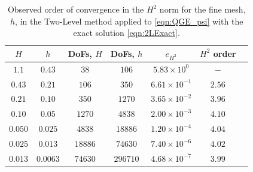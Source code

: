 \begin{table}
  \begin{center}
    \begin{tabular}{|c|c|c|c|c|c|c|}
    \hline
      $H$ &   $h$  &  DoFs, $ H $ & DoFs, $ h $ & $e_{H^2}$ & $H^2$ order \\
      \hline
      $1.1$ & $0.43$ & $38$ & $106$ & $5.83\times 10^0$ & $-$ \\
      $0.43$ & $0.21$ & $106$ & $350$ & $6.61\times 10^{-1}$ & $2.56$ \\
      $0.21$ & $0.10$ & $350$ & $1270$ & $3.65\times 10^{-2}$ & $3.96$ \\
      $0.10$ & $0.05$ & $1270$ & $4838$ & $2.00 \times 10^{-3}$ & $4.10$ \\
      $0.050$ & $0.025$ & $4838$ & $18886$ & $1.20\times 10^{-4}$ & $4.04$ \\
      $0.025$ & $0.013$ & $18886$ & $74630$ & $7.40\times 10^{-6}$ & $4.02$ \\
      $0.013$ & $0.0063$ & $74630$ & $296710$ & $4.68\times 10^{-7}$ & $3.99$ \\
    \hline
    \end{tabular}
  \end{center}
  \caption{Observed order of convergence in the $H^2$ norm for the fine mesh,
    $h$, in the Two-Level method applied to \eqref{eqn:QGE_psi} with the exact
    solution \eqref{eqn:2LExact}.}
  \label{tab:TwoLevelh}
\end{table}

